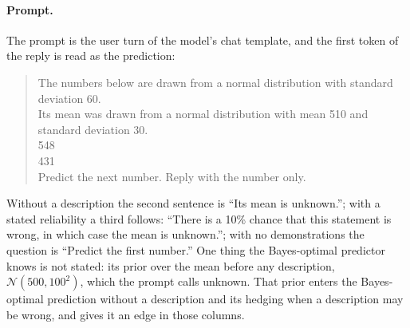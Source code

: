 \documentclass{article}
\begin{document}
\paragraph{Prompt.} The prompt is the user turn of the model's chat template, and the first token of the reply is read as the prediction:

\begin{quote}\small\ttfamily
The numbers below are drawn from a normal distribution with standard deviation 60.\\
Its mean was drawn from a normal distribution with mean 510 and standard deviation 30.\\[3pt]
548\\
431\\[3pt]
Predict the next number. Reply with the number only.
\end{quote}

\noindent Without a description the second sentence is ``Its mean is unknown.''; with a stated reliability a third follows: ``There is a 10\% chance that this statement is wrong, in which case the mean is unknown.''; with no demonstrations the question is ``Predict the first number.'' One thing the Bayes-optimal predictor knows is not stated: its prior over the mean before any description, $\mathcal{N}(500, 100^2)$, which the prompt calls unknown. That prior enters the Bayes-optimal prediction without a description and its hedging when a description may be wrong, and gives it an edge in those columns.
\end{document}
